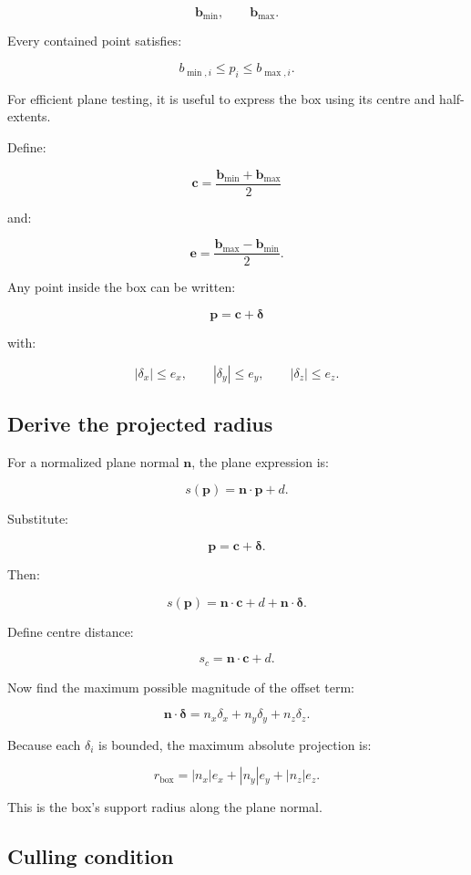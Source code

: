 \[
 \mathbf b_{\min}, \qquad \mathbf b_{\max}.
\]

Every contained point satisfies:

\[
 b_{\min,i}\le p_i\le b_{\max,i}.
\]

For efficient plane testing, it is useful to express the box using its centre and half-extents.

Define:

\[
 \boxed{ \mathbf c= \frac{\mathbf b_{\min}+\mathbf b_{\max}}2 }
\]

and:

\[
 \boxed{ \mathbf e= \frac{\mathbf b_{\max}-\mathbf b_{\min}}2 }.
\]

Any point inside the box can be written:

\[
 \mathbf p=\mathbf c+\boldsymbol\delta
\]

with:

\[
 |\delta_x|\le e_x, \qquad |\delta_y|\le e_y, \qquad |\delta_z|\le e_z.
\]

\subsection{Derive the projected radius}\label{02-foundations-ii-ch034-derive-the-projected-radius}

For a normalized plane normal \(\mathbf n\), the plane expression is:

\[
 s(\mathbf p)=\mathbf n\cdot\mathbf p+d.
\]

Substitute:

\[
 \mathbf p=\mathbf c+\boldsymbol\delta.
\]

Then:

\[
 s(\mathbf p)= \mathbf n\cdot\mathbf c+d+ \mathbf n\cdot\boldsymbol\delta.
\]

Define centre distance:

\[
 \boxed{ s_c=\mathbf n\cdot\mathbf c+d }.
\]

Now find the maximum possible magnitude of the offset term:

\[
 \mathbf n\cdot\boldsymbol\delta = n_x\delta_x+n_y\delta_y+n_z\delta_z.
\]

Because each \(\delta_i\) is bounded, the maximum absolute projection is:

\[
 \boxed{ r_{\mathrm{box}}= |n_x|e_x+|n_y|e_y+|n_z|e_z }.
\]

This is the box's support radius along the plane normal.

\subsection{Culling condition}\label{02-foundations-ii-ch034-culling-condition}

